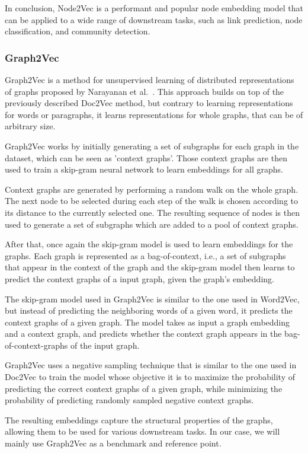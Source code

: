 In conclusion, Node2Vec is a performant and popular node embedding model that can be applied to a wide range of downstream tasks, such as link prediction, node classification, and community detection.

\subsubsection{Graph2Vec}
Graph2Vec is a method for unsupervised learning of distributed representations of graphs proposed by Narayanan et al.~\cite{2017graph2vec}. This approach builds on top of the previously described Doc2Vec method, but contrary to learning representations for words or paragraphs, it learns representations for whole graphs, that can be of arbitrary size.

Graph2Vec works by initially generating a set of subgraphs for each graph in the dataset, which can be seen as 'context graphs'. Those context graphs are then used to train a skip-gram neural network to learn embeddings for all graphs.

Context graphs are generated by performing a random walk on the whole graph. The next node to be selected during each step of the walk is chosen according to its distance to the currently selected one. The resulting sequence of nodes is then used to generate a set of subgraphs which are added to a pool of context graphs.

After that, once again the skip-gram model is used to learn embeddings for the graphs. Each graph is represented as a bag-of-context, i.e., a set of subgraphs that appear in the context of the graph and the skip-gram model then learns to predict the context graphs of a input graph, given the graph's embedding.

The skip-gram model used in Graph2Vec is similar to the one used in Word2Vec, but instead of predicting the neighboring words of a given word, it predicts the context graphs of a given graph. The model takes as input a graph embedding and a context graph, and predicts whether the context graph appears in the bag-of-context-graphs of the input graph.

Graph2Vec uses a negative sampling technique that is similar to the one used in Doc2Vec to train the model whose objective it is to maximize the probability of predicting the correct context graphs of a given graph, while minimizing the probability of predicting randomly sampled negative context graphs.

The resulting embeddings capture the structural properties of the graphs, allowing them to be used for various downstream tasks. In our case, we will mainly use Graph2Vec as a benchmark and reference point.

